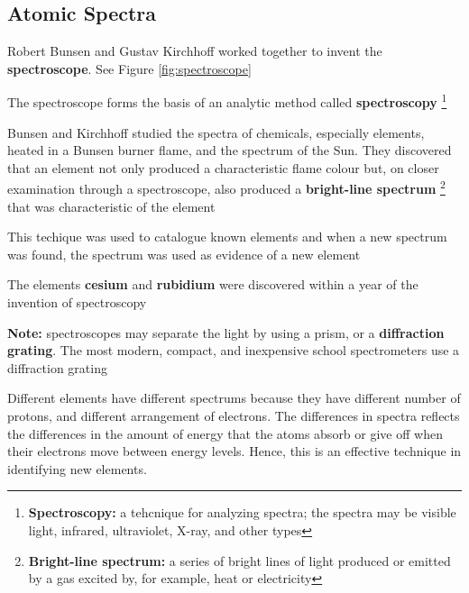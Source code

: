 \subsection{Atomic Spectra}
\begin{bulleted-list}
    \item Robert Bunsen and Gustav Kirchhoff worked together to invent the \textbf{spectroscope}.
        See Figure \ref{fig:spectroscope}
    \item The spectroscope forms the basis of an analytic method called \textbf{spectroscopy}
        \footnote{
            \textbf{Spectroscopy:} a tehcnique for analyzing spectra; the spectra may be visible
            light, infrared, ultraviolet, X-ray, and other types
        }
    \item Bunsen and Kirchhoff studied the spectra of chemicals, especially elements, heated in
        a Bunsen burner flame, and the spectrum of the Sun. They discovered that an element not
        only produced a characteristic flame colour but, on closer examination through a
        spectroscope, also produced a \textbf{bright-line spectrum}
        \footnote{
            \textbf{Bright-line spectrum:} a series of bright lines of light produced or emitted by
            a gas excited by, for example, heat or electricity
        }
        that was characteristic of
        the element
    \item This techique was used to catalogue known elements and when a new spectrum was found,
        the spectrum was used as evidence of a new element
    \item The elements \textbf{cesium} and \textbf{rubidium} were discovered within a year of
        the invention of spectroscopy
    \item \textbf{Note:} spectroscopes may separate the light by using a prism, or a
        \textbf{diffraction grating}. The most modern, compact, and inexpensive school spectrometers
        use a diffraction grating
\end{bulleted-list}

\begin{important}
    Different elements have different spectrums because they have different number of protons,
    and different arrangement of electrons. The differences in spectra reflects the differences
    in the amount of energy that the atoms absorb or give off when their electrons move between
    energy levels. Hence, this is an effective technique in identifying new elements.
\end{important}

